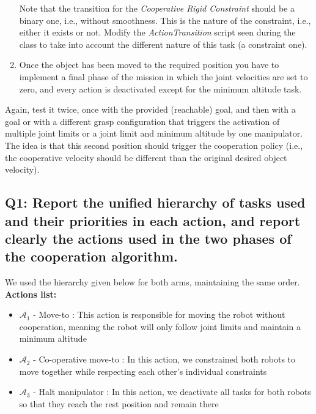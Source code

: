\documentclass{article}
\begin{document}
\begin{enumerate}
Note that the transition for the \textit{Cooperative Rigid Constraint} should be a binary one, i.e., without smoothness. This is the nature of the constraint, i.e., either it exists or not. Modify the \emph{ActionTransition} script seen during the class to take into account the different nature of this task (a constraint one).

\item Once the object has been moved to the required position you have to implement a final phase of the mission in which the joint velocities are set to zero, and every action is deactivated except for the minimum altitude task.
\end{enumerate}

 Again, test it twice, once with the provided (reachable) goal, and then with a goal or with a different grasp configuration that triggers the activation of multiple joint limits or a joint limit and minimum altitude by one manipulator. The idea is that this second position should trigger the cooperation policy (i.e., the cooperative velocity should be different than the original desired object velocity).

\clearpage
\subsection{Q1: Report the unified hierarchy of tasks used and their priorities in each action, and report clearly the actions used in the two phases of the cooperation algorithm.}
We used the hierarchy given below for both arms, maintaining the same order.\\
\noindent
\textbf{Actions list:}
\begin{itemize}
	\item $\mathcal{A}_{1}$ - Move-to : This action is responsible for moving the robot without cooperation, meaning the robot will only follow joint limits and maintain a minimum altitude
	\item $\mathcal{A}_{2}$ - Co-operative move-to : In this action, we constrained both robots to move together while respecting each other's individual constraints
	\item $\mathcal{A}_{3}$ - Halt manipulator : In this action, we deactivate all tasks for both robots so that they reach the rest position and remain there
\end{itemize}
\end{document}
